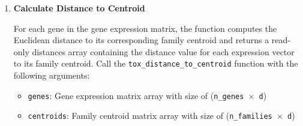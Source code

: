\begin{enumerate}
    \textbf{Mathematical Definition:}
    \[ \text{shift\_vector} = \text{expression\_vector} - \text{family\_centroid} \]
    
    \textbf{Arguments:}
    \begin{itemize}
        \item \texttt{expression\_vectors}: 2D numpy array of shape \texttt{(n\_axes, n\_vectors)} where each column is a gene expression vector
        \item \texttt{family\_centroids}: 2D numpy array of shape \texttt{(n\_axes, n\_families)} where each column is a family centroid vector
        \item \texttt{gene\_to\_centroid}: 1D numpy array of length \texttt{n\_vectors} containing 1-based family indices mapping each gene to its centroid
    \end{itemize}
    \textbf{Returns:}
    \begin{itemize}
        \item \texttt{shift\_vectors}: 2D numpy array of shape \texttt{(2*n\_axes, n\_vectors)} containing centroids (rows 0:n\_axes-1) and shift vectors (rows n\_axes:2*n\_axes-1) (read-only)
    \end{itemize}
    \begin{lstlisting}[language=Python, caption={Python Shift Vector Field Computation}]
shift_vectors = tox_compute_shift_vector_field(expression_vectors, 
                                family_centroids, gene_to_centroid)
    \end{lstlisting}
          
    \item \textbf{Calculate Distance to Centroid}
          
          For each gene in the gene expression matrix, the function computes the
          Euclidean distance to its corresponding family centroid and returns a read-only
          distances array containing the distance value for each expression vector
          to its family centroid. Call the \texttt{tox\_distance\_to\_centroid}
          function with the following arguments:
          
          \begin{itemize}
            \item \texttt{genes}: Gene expression matrix array with size of (\texttt{n\_genes
                  $\times$ d})
            
            \item \texttt{centroids}: Family centroid matrix array with size of (\texttt{n\_families
                  $\times$ d})
            

\end{itemize}
\end{enumerate}
